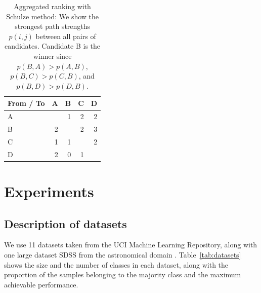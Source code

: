 \documentclass[fleqn,10pt,lineno]{wlpeerj} %
\begin{document}
\begin{table}[htbp]
	\begin{subtable}{\linewidth}
		\centering
		\begin{tabular}{lrrrr}
			\toprule
			{From / To}  & A & B & C & D \\
			\midrule
				A &   & 1 & 2 & 2 \\
				B & 2 &   & 2 & 3 \\
				C & 1 & 1 &   & 2 \\
				D & 2 & 0 & 1 &   \\
			\bottomrule
		\end{tabular}
		\caption{Aggregated ranking with Schulze method: We show the strongest
		path strengths $p(i, j)$ between all pairs of candidates. Candidate B
		is the winner since $p(B, A) > p(A, B)$, $p(B, C) > p(C, B)$, and $p(B,
		D) > p(D, B)$.}
	\end{subtable}
\end{table}


\section{Experiments}\label{sec:expt}

\subsection{Description of datasets}

We use 11 datasets taken from the UCI Machine Learning Repository, along
with one large dataset SDSS from the astronomical domain \citep{alam15}.
Table~\ref{tab:datasets} shows the size and the number of classes in each
dataset, along with the proportion of the samples belonging to the majority
class and the maximum achievable performance.
\end{document}
